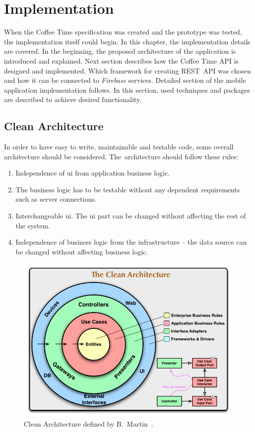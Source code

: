 \chapter{Implementation}
\label{ch:implementation}
When the Coffee Time specification was created and the prototype was tested, the implementation itself could begin. In this chapter, the implementation details are covered. In the beginning, the proposed architecture of the application is introduced and explained. Next section describes how the Coffee Time API is designed and implemented. Which framework for creating REST~API was chosen and how it can be connected to \textit{Firebase} services. Detailed section of the mobile application implementation follows. In this section, used techniques and packages are described to achieve desired functionality. 
\section{Clean Architecture}
In order to have easy to write, maintainable and testable code, some overall architecture should be considered. The~architecture should follow these rules: 
\begin{enumerate}
\item Independence of \gls{ui} from application business logic. 
\item The business logic has to be testable without any dependent requirements such as server connections.
\item Interchangeable \gls{ui}. The \gls{ui} part can be changed without affecting the rest of the system.
\item Independence of business logic from the infrastructure -- the data source can be changed without affecting business logic.
\end{enumerate}

\begin{figure}[ht]
    \centering
    \includegraphics[width=0.75\linewidth]{img/implementation/CleanArchitecture.jpg}
    \caption{Clean Architecture defined by B.~Martin~\cite{clean-architecture-article}.}
    \label{fig:clean-arch-bmartin}
\end{figure}

